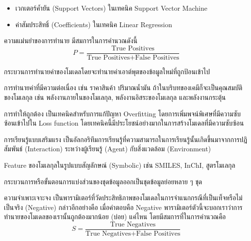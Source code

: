 \begin{description}[style=nextline]
\begin{itemize}
        \item เวกเตอร์ค้ำยัน (Support Vectors) ในเทคนิค Support Vector Machine
        
        \item ค่าสัมประสิทธิ์ (Coefficients) ในเทคนิค Linear Regression
    \end{itemize}

    \item[Precision] ความแม่นยำของการทำนาย มีสมการในการคำนวณดังนี้
    \begin{equation}\label{eq:precision}
        P 
        = 
        \frac{\text{True Positives}}{\text{True Positives} + \text{False Positives}}
    \end{equation}

    \item[Prediction] กระบวนการทำนายค่าของโมเดลโดยจะทำนายค่าเอาต์พุตของข้อมูลใหม่ที่ถูกป้อนเข้าไป

    \item[Regression]  การทำนายค่าที่มีความต่อเนื่อง เช่น ราคาสินค้า ปริมาณน้ำมัน ถ้าในบริบทของเคมีก็จะเป็นคุณสมบัติของโมเลกุล เช่น พลังงานภายในของโมเลกุล, พลังงานอิสระของโมเลกุล และพลังงานกระตุ้น

    \item[Regularization] การทำให้ถูกต้อง เป็นเทคนิคสำหรับการแก้ปัญหา Overfitting โดยการเพิ่มพจน์พิเศษที่มีความซับซ้อนเข้าไปใน Loss function โดยเทคนิคนี้มีประโยชน์อย่างมากในการสร้างโมเดลที่มีความซับซ้อน

    \item[Reinforment Learning] การเรียนรู้แบบเสริมแรง เป็นอัลกอริทึมการเรียนรู้ที่ความสามารถในการเรียนรู้นั้นเกิดขึ้นมาจากการปฎิสัมพันธ์ (Interaction) ระหว่างผู้เรียนรู้ (Agent) กับสิ่งแวดล้อม (Environment)

    \item[Representation] Feature ของโมเลกุลในรูปแบบสัญลักษณ์ (Symbolic) เช่น SMILES, InChI, สูตรโมเลกุล

    \item[Segmentation] กระบวนการหรือขั้นตอนการแบ่งส่วนของชุดข้อมูลออกเป็นชุดข้อมูลย่อยหลาย ๆ ชุด

    \item[Specificity] ความจำเพาะเจาะจง เป็นพารามิเตอร์ที่วัดประสิทธิภาพของโมเดลในการจำแนกกรณีที่เป็นเท็จหรือไม่เป็นจริง (Negative) กล่าวอีกอย่างคือ เมื่อคำตอบคือ Negative พารามิเตอร์ตัวนี้จะบอกเราว่าการทำนายของโมเดลของเรานั้นถูกต้องมากน้อย (บ่อย) แค่ไหน โดยมีสมการที่ในการคำนวณคือ
    \begin{equation}\label{eq:specficity}
        S 
        = 
        \frac{\text{True Negatives}}{\text{True Negatives} + \text{False Positives}}
    \end{equation}


\end{description}

